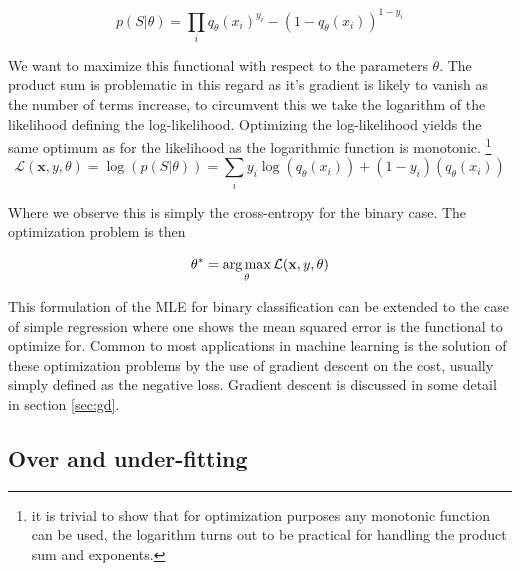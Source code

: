 \begin{equation}\label{eq:likelihood}
p(S | \theta) = \prod_i q_\theta(x_i)^{y_i} - (1-q_\theta(x_i))^{1-y_i}
\end{equation}

\noindent We want to maximize this functional with respect to the parameters $\theta$. The product sum is problematic in this regard as it's gradient is likely to vanish as the number of terms increase, to circumvent this we take the logarithm of the likelihood defining the log-likelihood. Optimizing the log-likelihood yields the same optimum as for the likelihood as the logarithmic function is monotonic. \footnote{it is trivial to show that for optimization purposes any monotonic function can be used, the logarithm turns out to be practical for handling the product sum and exponents.}
\begin{equation}
\mathcal{L}(\mathbf{x}, y, \theta) = \log(p(S | \theta)) = \sum_i y_i\log(q_\theta(x_i)) + (1-y_i)(q_\theta(x_i))
\end{equation}

\noindent Where we observe this is simply the cross-entropy for the binary case. The optimization problem is then 

\begin{equation}
\theta^* = \operatorname*{arg\,max}_\theta \mathcal{L}(\mathbf{x}, y, \theta )
\end{equation}

\noindent This formulation of the MLE for binary classification can be extended to the case of simple regression where one shows the mean squared error is the functional to optimize for. Common to most applications in machine learning is the solution of these optimization problems by the use of gradient descent on the cost, usually simply defined as the negative loss. Gradient descent is discussed in some detail in section \ref{sec:gd}.

\subsection{Over and under-fitting}

